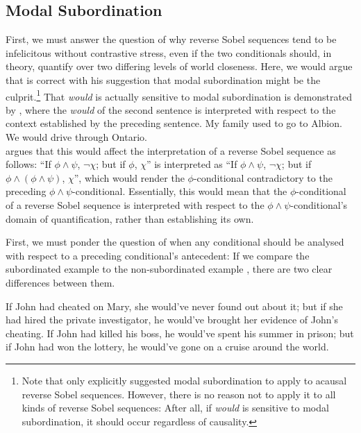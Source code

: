 \subsection{Modal Subordination}
First, we must answer the question of why reverse Sobel sequences tend to be infelicitous without contrastive stress, even if the two conditionals should, in theory, quantify over two differing levels of world closeness. Here, we would argue that \textcite{Klecha2014,Klecha2015} is correct with his suggestion that modal subordination might be the culprit.\footnote{Note that \textcite{Klecha2014,Klecha2015} only explicitly suggested modal subordination to apply to acausal reverse Sobel sequences. However, there is no reason not to apply it to all kinds of reverse Sobel sequences: After all, if \textit{would} is sensitive to modal subordination, it should occur regardless of causality.} That \textit{would} is actually sensitive to modal subordination is demonstrated by , where the \textit{would} of the second sentence is interpreted with respect to the context established by the preceding sentence.
\ex{} 
My family used to go to Albion. We would drive through Ontario.\\\emptyfill\parencite[p.~378]{Klecha2011} 
\xe
\textcite{Klecha2014,Klecha2015} argues that this would affect the interpretation of a reverse Sobel sequence as follows: \enquote{If $\phi\land\psi$, $\neg\chi$; but if $\phi$, $\chi$} is interpreted as \enquote{If $\phi\land\psi$, $\neg\chi$; but if $\phi\land(\phi\land\psi)$, $\chi$}, which would render the $\phi$-conditional contradictory to the preceding $\phi\land\psi$-conditional. Essentially, this would mean that the $\phi$-conditional of a reverse Sobel sequence is interpreted with respect to the $\phi\land\psi$-conditional's domain of quantification, rather than establishing its own. 

First, we must ponder the question of when any conditional should be analysed with respect to a preceding conditional's antecedent: If we compare the subordinated example  to the non-subordinated example , there are two clear differences between them. 

\ex{}
{}
If John had cheated on Mary, she would've never found out about it; but if she had hired the private investigator, he would've brought her evidence of John's cheating.
\xe
\ex{}
{}If John had killed his boss, he would've spent his summer in prison; but if John had won the lottery, he would've gone on a cruise around the world.
\xe

